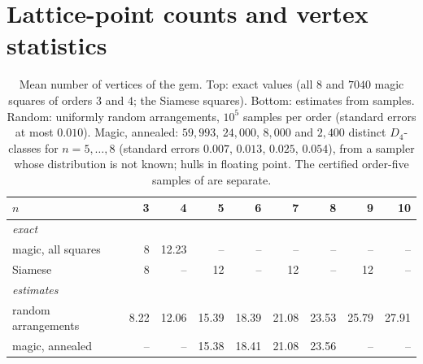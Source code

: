 \begin{table}[htbp]
\centering
\caption{Proof of : the sixteen vertices $q_1,\dots,q_{16}$ of the level polygons of the digit-exchanged square after the shear $\Phi'$ (heights $n+1$, $n$, $0$, $-n$, $-(n+1)$) and the slacks of the inequalities $(1)$--$(7)$ at them, as polynomials in $m$; zeros in bold. All non-zero entries are positive for $m\ge2$. The points $q_4,q_{14},q_9,q_{16}$ are not vertices of the gem.}
\label{tab:slacks-exchanged}
\scriptsize
\setlength{\tabcolsep}{4pt}
\resizebox{0.9\textwidth}{!}{}
\end{table}

\section{Lattice-point counts and vertex statistics}
\label{sec:lattice-stats}

\begin{table}[htbp]
\centering
\caption{Mean number of vertices of the gem. Top: exact values (all $8$ and $7040$ magic squares of orders $3$ and $4$; the Siamese squares). Bottom: estimates from samples. Random: uniformly random arrangements, $10^5$ samples per order (standard errors at most $0.010$). Magic, annealed: $59{,}993$, $24{,}000$, $8{,}000$ and $2{,}400$ distinct $D_4$-classes for $n=5,\dots,8$ (standard errors $0.007$, $0.013$, $0.025$, $0.054$), from a sampler whose distribution is not known; hulls in floating point. The certified order-five samples of  are separate.}
\label{tab:vertices}
\small
\begin{tabular}{l rrrrrrrr}
\toprule
$n$ & 3 & 4 & 5 & 6 & 7 & 8 & 9 & 10\\
\midrule
\multicolumn{9}{l}{\emph{exact}}\\
magic, all squares & 8 & 12.23 & -- & -- & -- & -- & -- & --\\
Siamese & 8 & -- & 12 & -- & 12 & -- & 12 & --\\
\midrule
\multicolumn{9}{l}{\emph{estimates}}\\
random arrangements & 8.22 & 12.06 & 15.39 & 18.39 & 21.08 & 23.53 & 25.79 & 27.91\\
magic, annealed & -- & -- & 15.38 & 18.41 & 21.08 & 23.56 & -- & --\\
\bottomrule
\end{tabular}
\end{table}

